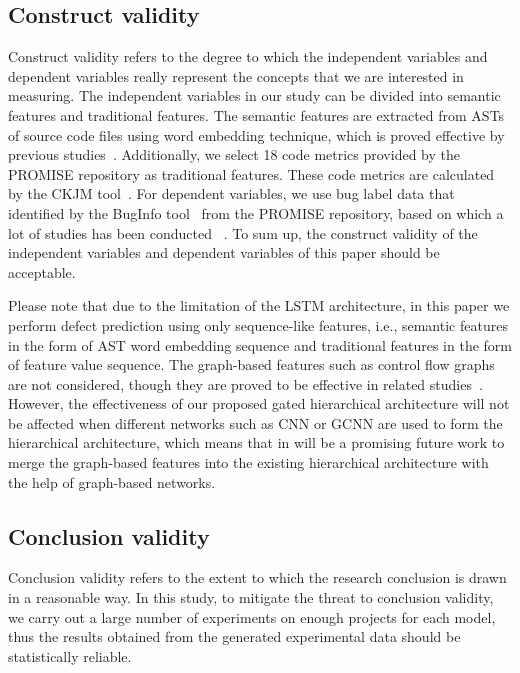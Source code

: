 \documentclass[journal]{IEEEtran}
\begin{document}
\subsection{Construct validity}
Construct validity refers to the degree to which the independent variables and dependent variables really represent the concepts that we are interested in measuring. The independent variables in our study can be divided into semantic features and traditional features. The semantic features are extracted from ASTs of source code files using word embedding technique, which is proved effective by previous studies~\cite{liang2019seml,fan2019deep}. Additionally, we select 18 code metrics provided by the PROMISE repository as traditional features. These code metrics are calculated by the CKJM tool~\cite{jureczko2010towards}. For dependent variables, we use bug label data that identified by the BugInfo tool~\cite{jureczko2010using} from the PROMISE repository, based on which a lot of studies has been conducted ~\cite{wang2018deep,liang2019seml,fan2019deep}. To sum up, the construct validity of the independent variables and dependent variables of this paper should be acceptable.

Please note that due to the limitation of the LSTM architecture, in this paper we perform defect prediction using only sequence-like features, i.e., semantic features in the form of AST word embedding sequence and traditional features in the form of feature value sequence. The graph-based features such as control flow graphs are not considered, though they are proved to be effective in related studies~\cite{phan2017convolutional, whua2020fcca}. However, the effectiveness of our proposed gated hierarchical architecture will not be affected when different networks such as CNN or GCNN are used to form the hierarchical architecture, which means that in will be a promising future work to merge the graph-based features into the existing hierarchical architecture with the help of graph-based networks.
\subsection{Conclusion validity}
Conclusion validity refers to the extent to which the research conclusion is drawn in a reasonable way. In this study, to mitigate the threat to conclusion validity, we carry out a large number of experiments on enough projects for each model, thus the results obtained from the generated experimental data should be statistically reliable. 
\end{document}
